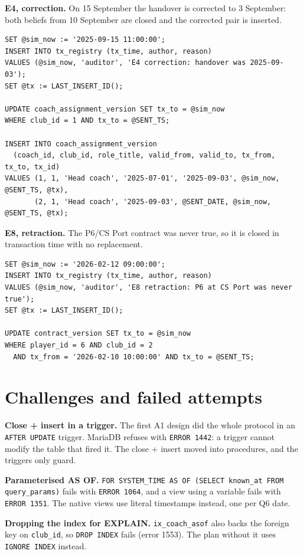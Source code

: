 \documentclass[10pt,a4paper]{article}
\newcommand{\code}[1]{\texttt{\small #1}}
\begin{document}
\textbf{E4, correction.}  On 15 September the handover is corrected to 3 September:
both beliefs from 10 September are closed and the corrected pair is inserted.
\begin{lstlisting}
SET @sim_now := '2025-09-15 11:00:00';
INSERT INTO tx_registry (tx_time, author, reason)
VALUES (@sim_now, 'auditor', 'E4 correction: handover was 2025-09-03');
SET @tx := LAST_INSERT_ID();

UPDATE coach_assignment_version SET tx_to = @sim_now
WHERE club_id = 1 AND tx_to = @SENT_TS;

INSERT INTO coach_assignment_version
  (coach_id, club_id, role_title, valid_from, valid_to, tx_from, tx_to, tx_id)
VALUES (1, 1, 'Head coach', '2025-07-01', '2025-09-03', @sim_now, @SENT_TS, @tx),
       (2, 1, 'Head coach', '2025-09-03', @SENT_DATE, @sim_now, @SENT_TS, @tx);
\end{lstlisting}

\textbf{E8, retraction.}  The P6/CS Port contract was never true, so it is closed in
transaction time with no replacement.
\begin{lstlisting}
SET @sim_now := '2026-02-12 09:00:00';
INSERT INTO tx_registry (tx_time, author, reason)
VALUES (@sim_now, 'auditor', 'E8 retraction: P6 at CS Port was never true');
SET @tx := LAST_INSERT_ID();

UPDATE contract_version SET tx_to = @sim_now
WHERE player_id = 6 AND club_id = 2
  AND tx_from = '2026-02-10 10:00:00' AND tx_to = @SENT_TS;
\end{lstlisting}

\section{Challenges and failed attempts}
\textbf{Close + insert in a trigger.}  The first A1 design did the whole protocol in
an \code{AFTER UPDATE} trigger.  MariaDB refuses with \code{ERROR 1442}: a trigger
cannot modify the table that fired it.  The close + insert moved into procedures,
and the triggers only guard.

\textbf{Parameterised AS OF.}  \code{FOR SYSTEM\_TIME AS OF (SELECT known\_at FROM
query\_params)} fails with \code{ERROR 1064}, and a view using a variable fails with
\code{ERROR 1351}.  The native views use literal timestamps instead, one per Q6 date.

\textbf{Dropping the index for EXPLAIN.}  \code{ix\_coach\_asof} also backs the
foreign key on \code{club\_id}, so \code{DROP INDEX} fails (error 1553).  The plan
without it uses \code{IGNORE INDEX} instead.
\end{document}
